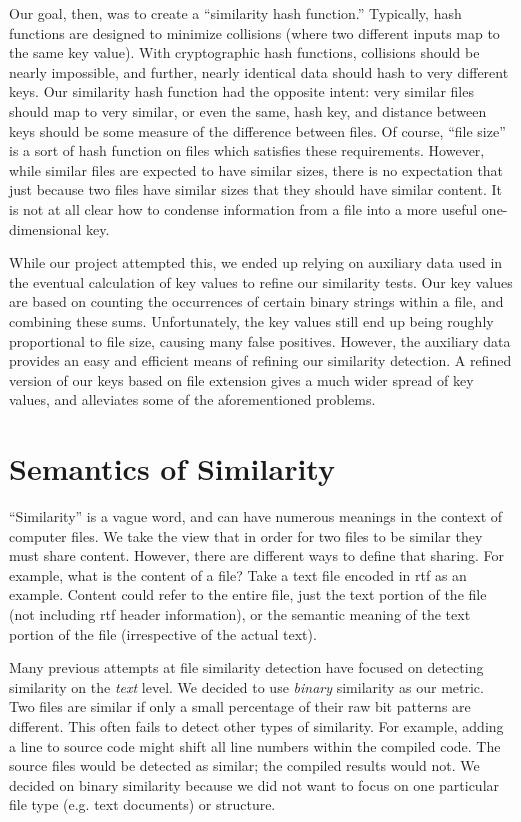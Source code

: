 \documentclass[10pt, twocolumn]{article}
\begin{document}
Our goal, then, was to create a ``similarity hash function.''  Typically, hash functions are designed to minimize collisions (where two different inputs map to the same key value).  With cryptographic hash functions, collisions should be nearly impossible, and further, nearly identical data should hash to very different keys.  Our similarity hash function had the opposite intent: very similar files should map to very similar, or even the same, hash key, and distance between keys should be some measure of the difference between files.  Of course, ``file size'' is a sort of hash function on files which satisfies these requirements.  However, while similar files are expected to have similar sizes, there is no expectation that just because two files have similar sizes that they should have similar content.  It is not at all clear how to condense information from a file into a more useful one-dimensional key.

While our project attempted this, we ended up relying on auxiliary data used in the eventual calculation of key values to refine our similarity tests.  Our key values are based on counting the occurrences of certain binary strings within a file, and combining these sums.  Unfortunately, the key values still end up being roughly proportional to file size, causing many false positives.  However, the auxiliary data provides an easy and efficient means of refining our similarity detection.  A refined version of our keys based on file extension gives a much wider spread of key values, and alleviates some of the aforementioned problems.





\section{Semantics of Similarity}

``Similarity'' is a vague word, and can have numerous meanings in the context of computer files. We take the view that in order for two files to be similar they must share content. However, there are different ways to define that sharing. For example, what is the content of a file? Take a text file encoded in rtf as an example. Content could refer to the entire file, just the text portion of the file (not including rtf header information), or the semantic meaning of the text portion of the file (irrespective of the actual text). 

Many previous attempts at file similarity detection have focused on detecting similarity on the \emph{text} \cite{hpDocRepositories, hoad} level. We decided to use \emph{binary} similarity as our metric. Two files are similar if only a small percentage of their raw bit patterns are different. This often fails to detect other types of similarity.  For example, adding a line to source code might shift all line numbers within the compiled code.  The source files would be detected as similar; the compiled results would not.  We decided on binary similarity because we did not want to focus on one particular file type (e.g. text documents) or structure. 
\end{document}
